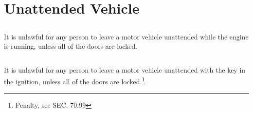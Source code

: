 \section{Unattended Vehicle}
\subsection{}
It is unlawful for any person to leave a motor vehicle unattended while the engine is running, unless all of the doors are locked.
\subsection{}
It is unlawful for any person to leave a motor vehicle unattended with the key in the ignition, unless all of the doors are locked.\footnote{Penalty, see SEC. 70.99}
